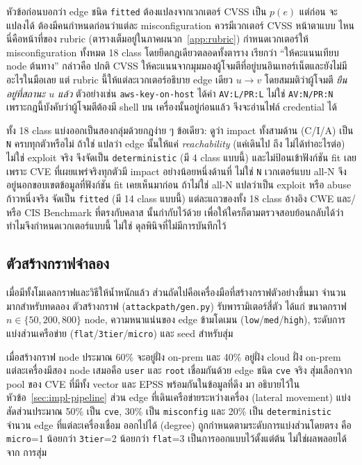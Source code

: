 หัวข้อก่อนบอกว่า edge ชนิด \texttt{fitted} ต้องแปลงจากเวกเตอร์ CVSS เป็น $p(e)$ แต่ก่อน
จะแปลงได้ ต้องมีคนกำหนดก่อนว่าแต่ละ misconfiguration ควรมีเวกเตอร์ CVSS หน้าตาแบบ
ไหน นี่คือหน้าที่ของ rubric (ตารางเต็มอยู่ในภาคผนวก~\ref{app:rubric}) กำหนดเวกเตอร์ให้
misconfiguration ทั้งหมด 18 class โดยยึดกฎเดียวตลอดทั้งตาราง เรียกว่า ``ให้คะแนนเทียบ
node ต้นทาง'' กล่าวคือ ปกติ CVSS ให้คะแนนจากมุมมองผู้โจมตีที่อยู่บนอินเทอร์เน็ตและยังไม่มี
อะไรในมือเลย แต่ rubric นี้ให้แต่ละเวกเตอร์อธิบาย edge เดียว $u \to v$ โดยสมมติว่าผู้โจมตี
\emph{ยืนอยู่ที่สถานะ $u$ แล้ว} ตัวอย่างเช่น \texttt{aws-key-on-host} ได้ค่า
\texttt{AV:L/PR:L} ไม่ใช่ \texttt{AV:N/PR:N} เพราะกฎนี้บังคับว่าผู้โจมตีต้องมี shell บน
เครื่องนั้นอยู่ก่อนแล้ว จึงจะอ่านไฟล์ credential ได้

ทั้ง 18 class แบ่งออกเป็นสองกลุ่มด้วยกฎง่าย ๆ ข้อเดียว: ดูว่า impact ทั้งสามด้าน (C/I/A)
เป็น \texttt{N} ครบทุกตัวหรือไม่ ถ้าใช่ แปลว่า edge นั้นให้แค่ \emph{reachability} (แค่เดินไป
ถึง ไม่ได้ทำอะไรต่อ) ไม่ใช่ exploit จริง จึงจัดเป็น \texttt{deterministic} (มี 4 class แบบนี้)
และไม่ป้อนเข้าฟังก์ชัน fit เลย เพราะ CVE ที่เผยแพร่จริงทุกตัวมี impact อย่างน้อยหนึ่งด้านที่
ไม่ใช่ \texttt{N} เวกเตอร์แบบ all-N จึงอยู่นอกขอบเขตข้อมูลที่ฟังก์ชัน fit เคยเห็นมาก่อน
ถ้าไม่ใช่ all-N แปลว่าเป็น exploit หรือ abuse ก้าวหนึ่งจริง จัดเป็น \texttt{fitted} (มี 14
class แบบนี้) แต่ละแถวของทั้ง 18 class อ้างอิง CWE และ/หรือ CIS Benchmark ที่ตรงกับคลาส
นั้นกำกับไว้ด้วย เพื่อให้ใครก็ตามตรวจสอบย้อนกลับได้ว่าทำไมจึงกำหนดเวกเตอร์แบบนี้ ไม่ใช่
ดุลพินิจที่ไม่มีการบันทึกไว้

\subsection{ตัวสร้างกราฟจำลอง}\label{sec:design-gen}

เมื่อมีทั้งโมเดลกราฟและวิธีให้น้ำหนักแล้ว ส่วนถัดไปคือเครื่องมือที่สร้างกราฟตัวอย่างขึ้นมา
จำนวนมากสำหรับทดลอง ตัวสร้างกราฟ (\texttt{attackpath/gen.py}) รับพารามิเตอร์สี่ตัว ได้แก่
ขนาดกราฟ $n \in \{50, 200, 800\}$ node, ความหนาแน่นของ edge ข้ามโดเมน
(\texttt{low}/\texttt{med}/\texttt{high}), ระดับการแบ่งส่วนเครือข่าย
(\texttt{flat}/\texttt{3tier}/\texttt{micro}) และ seed สำหรับสุ่ม

เมื่อสร้างกราฟ node ประมาณ 60\% จะอยู่ฝั่ง on-prem และ 40\% อยู่ฝั่ง cloud ฝั่ง on-prem
แต่ละเครื่องมีสอง node เสมอคือ \texttt{user} และ \texttt{root} เชื่อมกันด้วย edge ชนิด
\texttt{cve} จริง สุ่มเลือกจาก pool ของ CVE ที่มีทั้ง vector และ EPSS พร้อมกันในข้อมูลที่ดึง
มา อธิบายไว้ในหัวข้อ~\ref{sec:impl-pipeline} ส่วน edge ที่เดินเครือข่ายระหว่างเครื่อง
(lateral movement) แบ่งสัดส่วนประมาณ 50\% เป็น \texttt{cve}, 30\% เป็น
\texttt{misconfig} และ 20\% เป็น \texttt{deterministic} จำนวน edge ที่แต่ละเครื่องเชื่อม
ออกไปได้ (degree) ถูกกำหนดตามระดับการแบ่งส่วนโดยตรง คือ \texttt{micro}=1 น้อยกว่า
\texttt{3tier}=2 น้อยกว่า \texttt{flat}=3 เป็นการออกแบบไว้ตั้งแต่ต้น ไม่ใช่ผลพลอยได้จาก
การสุ่ม

